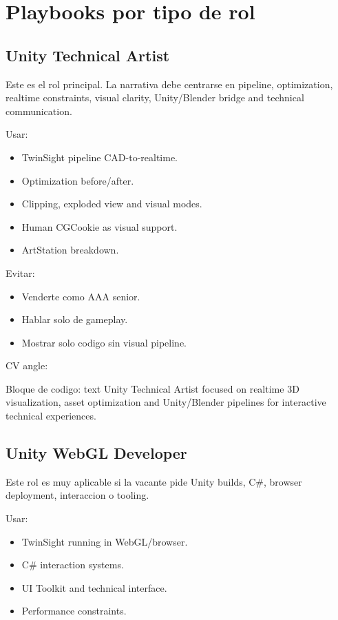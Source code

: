 \chapter{Playbooks por tipo de rol}

\section{Unity Technical Artist}


Este es el rol principal. La narrativa debe centrarse en pipeline, optimization, realtime constraints, visual clarity, Unity/Blender bridge and technical communication.


Usar:


\begin{itemize}
\item TwinSight pipeline CAD-to-realtime.
\item Optimization before/after.
\item Clipping, exploded view and visual modes.
\item Human CGCookie as visual support.
\item ArtStation breakdown.
\end{itemize}


Evitar:


\begin{itemize}
\item Venderte como AAA senior.
\item Hablar solo de gameplay.
\item Mostrar solo codigo sin visual pipeline.
\end{itemize}


CV angle:


\begin{mdcode}
Bloque de codigo: text
Unity Technical Artist focused on realtime 3D visualization, asset optimization and Unity/Blender pipelines for interactive technical experiences.
\end{mdcode}


\section{Unity WebGL Developer}


Este rol es muy aplicable si la vacante pide Unity builds, C\#, browser deployment, interaccion o tooling.


Usar:


\begin{itemize}
\item TwinSight running in WebGL/browser.
\item C\# interaction systems.
\item UI Toolkit and technical interface.
\item Performance constraints.
\end{itemize}


